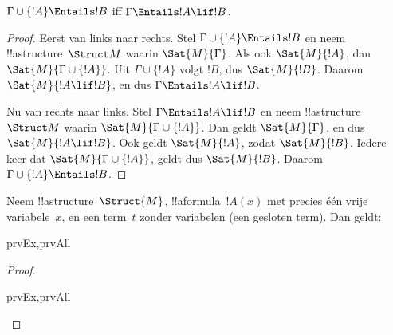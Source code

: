 \documentclass[openany]{memoir}
\begin{document}
\begin{thm}
$\Gamma \cup \{!A\} \Entails !B$ iff $\Gamma \Entails !A \lif !B$.
\end{thm}

\begin{proof}
Eerst van links naar rechts. Stel
$\Gamma \cup \{ !A \} \Entails !B$ en neem !!a{structure}~$\Struct M$
waarin $\Sat{M}{\Gamma}$. Als ook $\Sat{M}{!A}$, dan
$\Sat{M}{\Gamma \cup \{ !A \} }$. Uit
$\Gamma \cup \{ !A \}$ volgt $!B$, dus $\Sat{M}{!B}$. Daarom
$\Sat{M}{!A \lif !B}$, en dus
$\Gamma \Entails !A \lif !B$.

Nu van rechts naar links. Stel $\Gamma \Entails !A \lif !B$ en neem
!!a{structure}~$\Struct M$ waarin
$\Sat{M}{\Gamma \cup \{ !A \}}$. Dan geldt $\Sat{M}{\Gamma}$, en dus
$\Sat{M}{!A \lif !B}$. Ook geldt $\Sat{M}{!A}$, zodat
$\Sat{M}{!B}$. Iedere keer dat
$\Sat{M}{\Gamma \cup \{ !A \} }$, geldt dus $\Sat{M}{!B}$. Daarom
$\Gamma \cup \{ !A \} \Entails !B$.
\end{proof}

\begin{prop}
  Neem !!a{structure}~$\Struct{M}$, !!a{formula}~$!A(x)$ met precies
  één vrije variabele~$x$, en een term~$t$ zonder variabelen (een
  gesloten term). Dan geldt:
  \begin{tagenumerate}{prvEx,prvAll}
  \end{tagenumerate}
\end{prop}

\begin{proof}
  \begin{tagenumerate}{prvEx,prvAll}
  \end{tagenumerate}
\end{proof}
\end{document}
